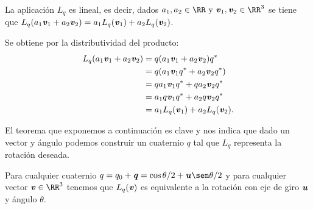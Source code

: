 		\bigskip
		\begin{observacion}
			La aplicación $ L_q $ es lineal, es decir, dados $ a_1,a_2 \in \RR \text{ y } \vv_1, \vv_2 \in \RR^3$ se tiene que $ L_q(a_1\textbf{\emph{v}}_1 + a_2 \textbf{\emph{v}}_2) = a_1 L_q (\textbf{\emph{v}}_1) + a_2 L_q(\textbf{\emph{v}}_2) $.
		\end{observacion}
		Se obtiene por la distributividad del producto:
		\begin{equation*}
		\begin{split}
		L_q(a_1\textbf{\emph{v}}_1 + a_2 \textbf{\emph{v}}_2 ) &=q(a_1\textbf{\emph{v}}_1 + a_2 \textbf{\emph{v}}_2)q^* \\
		&=q(a_1\textbf{\emph{v}}_1 q^* + a_2 \textbf{\emph{v}}_2 q^*) \\
		&=qa_1\textbf{\emph{v}}_1 q^*  + qa_2 \textbf{\emph{v}}_2 q^*\\
		&= a_1q\textbf{\emph{v}}_1 q^*  + a_2 q\textbf{\emph{v}}_2 q^* \\
		&=a_1 L_q (\textbf{\emph{v}}_1) + a_2 L_q(\textbf{\emph{v}}_2).
		\end{split}			
		\end{equation*}
		\bigskip
		
		El teorema que exponemos a continuación es clave y nos indica que dado un vector y ángulo podemos construir un cuaternio $ q $ tal que $ L_q $ representa la rotación deseada.
		
		\begin{teoremaBox}
			Para cualquier cuaternio $ q = q_0 + \qq = \cos \theta/2 + \uu \sen \theta/2$ y para cualquier vector $ \vv \in \RR^3 $ tenemos que $ L_q(\textbf{\emph{v}}) $ es equivalente a la rotación con eje de giro $ \textbf{\emph{u}} $ y ángulo $ \theta $. 
		\end{teoremaBox}
	
